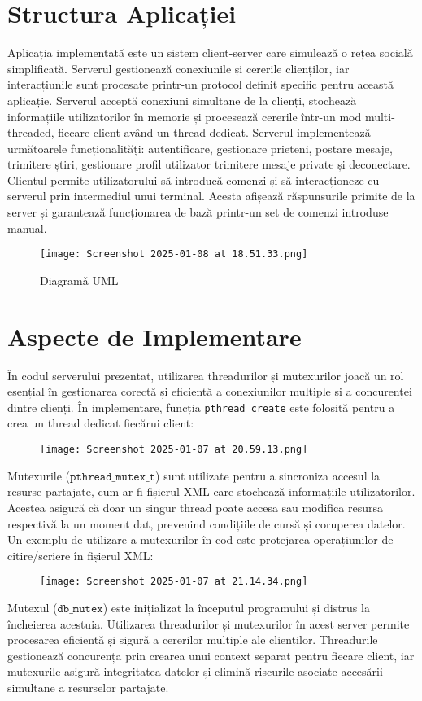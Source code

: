 \documentclass[12pt, a4paper]{article}
\begin{document}
\section{Structura Aplicației}
Aplicația implementată este un sistem client-server care simulează o rețea socială simplificată. Serverul gestionează conexiunile și cererile clienților, iar interacțiunile sunt procesate printr-un protocol definit specific pentru această aplicație.
Serverul acceptă conexiuni simultane de la clienți, stochează informațiile utilizatorilor în memorie și procesează cererile într-un mod multi-threaded, fiecare client având un thread dedicat. Serverul implementează următoarele funcționalități: autentificare, gestionare prieteni, postare mesaje, trimitere știri, gestionare profil utilizator trimitere mesaje private și deconectare.
Clientul permite utilizatorului să introducă comenzi și să interacționeze cu serverul prin intermediul unui terminal. Acesta afișează răspunsurile primite de la server și garantează funcționarea de bază printr-un set de comenzi introduse manual.

\begin{figure}[H]
    \centering
    \texttt{[image: Screenshot 2025-01-08 at 18.51.33.png]}
    \caption{Diagramǎ UML}
    \label{fig:enter-label}
\end{figure}

\section{Aspecte de Implementare}
În codul serverului prezentat, utilizarea threadurilor și mutexurilor joacă un rol esențial în gestionarea corectă și eficientă a conexiunilor multiple și a concurenței dintre clienți.
În implementare, funcția \texttt{pthread\_create} este folosită pentru a crea un thread dedicat fiecărui client:
\begin{figure}[H]
    \centering
    \texttt{[image: Screenshot 2025-01-07 at 20.59.13.png]}
    \label{fig:enter-label}
\end{figure}
Mutexurile ($\mathtt{pthread\_mutex\_t}$) sunt utilizate pentru a sincroniza accesul la resurse partajate, cum ar fi fișierul XML care stochează informațiile utilizatorilor. Acestea asigură că doar un singur thread poate accesa sau modifica resursa respectivă la un moment dat, prevenind condițiile de cursă și coruperea datelor.
Un exemplu de utilizare a mutexurilor în cod este protejarea operațiunilor de citire/scriere în fișierul XML:
\begin{figure}[H]
    \centering
    \texttt{[image: Screenshot 2025-01-07 at 21.14.34.png]}
    \label{fig:enter-label}
\end{figure}
Mutexul ($\mathtt{db\_mutex}$) este inițializat la începutul programului și distrus la încheierea acestuia.
Utilizarea threadurilor și mutexurilor în acest server permite procesarea eficientă și sigură a cererilor multiple ale clienților. Threadurile gestionează concurența prin crearea unui context separat pentru fiecare client, iar mutexurile asigură integritatea datelor și elimină riscurile asociate accesării simultane a resurselor partajate.
\end{document}
